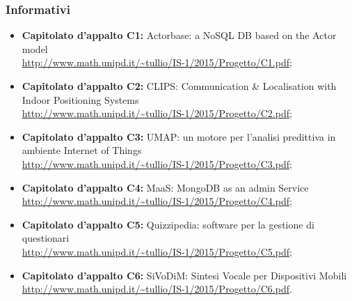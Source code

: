 \subsubsection{Informativi}
\begin{itemize}
\item \textbf{Capitolato d'appalto C1:} Actorbase: a NoSQL DB based on the Actor model
\\\url{http://www.math.unipd.it/~tullio/IS-1/2015/Progetto/C1.pdf};
\item \textbf{Capitolato d'appalto C2:} CLIPS: Communication \& Localisation with Indoor Positioning Systems
\\\url{http://www.math.unipd.it/~tullio/IS-1/2015/Progetto/C2.pdf}; 
\item \textbf{Capitolato d'appalto C3:} UMAP: un motore per l'analisi predittiva in ambiente Internet of Things 
\\\url{http://www.math.unipd.it/~tullio/IS-1/2015/Progetto/C3.pdf}; 
\item \textbf{Capitolato d'appalto C4:} MaaS: MongoDB as an admin Service
\\\url{http://www.math.unipd.it/~tullio/IS-1/2015/Progetto/C4.pdf}; 
\item \textbf{Capitolato d'appalto C5:} Quizzipedia: software per la gestione di questionari
\\\url{http://www.math.unipd.it/~tullio/IS-1/2015/Progetto/C5.pdf}; 
\item \textbf{Capitolato d'appalto C6:} SiVoDiM: Sintesi Vocale per Dispositivi Mobili 
\\\url{http://www.math.unipd.it/~tullio/IS-1/2015/Progetto/C6.pdf}.
\end{itemize}